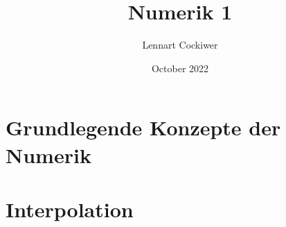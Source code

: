 \documentclass{Skript}
\title{Numerik 1}
\author{Lennart Cockiwer}
\date{October 2022}
\begin{document}
\maketitle
\newpage
\tableofcontents
\chapter{Grundlegende Konzepte der Numerik}

\chapter{Interpolation}

\end{document}
